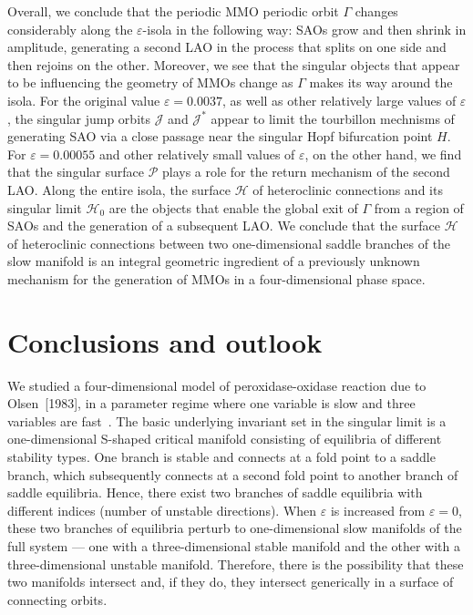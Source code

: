 \documentclass{ws-ijbc}
\begin{document}
Overall, we conclude that the periodic MMO periodic orbit $\Gamma$ changes considerably along the $\varepsilon$-isola in the following way: SAOs grow and then shrink in amplitude, generating a second LAO in the process that splits on one side and then rejoins on the other.  Moreover, we see that the singular objects that appear to be influencing the geometry of MMOs change as $\Gamma$ makes its way around the isola.  For the original value $\varepsilon=0.0037$, as well as other relatively large values of $\varepsilon$, the singular jump orbits $\mathscr{J}$ and $\mathscr{J}^*$ appear to limit the tourbillon mechnisms of generating SAO via a close passage near the singular Hopf bifurcation point $H$. For $\varepsilon=0.00055$ and other relatively small values of $\varepsilon$, on the other hand, we find that the singular surface $\mathscr{P}$ plays a role for the return mechanism of the second LAO. Along the entire isola, the surface $\mathscr{H}$ of heteroclinic connections and its singular limit $\mathscr{H}_0$ are the objects that enable the global exit of $\Gamma$ from a region of SAOs and the generation of a subsequent LAO. We conclude that the surface $\mathscr{H}$ of heteroclinic connections between two one-dimensional saddle branches of the slow manifold is an integral geometric ingredient of a previously unknown mechanism for the generation of MMOs in a four-dimensional phase space.


\section{Conclusions and outlook}
\label{sec:concl}

We studied a four-dimensional model of peroxidase-oxidase reaction due to Olsen~[1983], in a parameter regime where one variable is slow and three variables are fast~\cite{Rescaling}. The basic underlying invariant set in the singular limit is a one-dimensional S-shaped critical manifold consisting of equilibria of different stability types. One branch is stable and connects at a fold point to a saddle branch, which subsequently connects at a second fold point to another branch of saddle equilibria. Hence, there exist two branches of saddle equilibria with different indices (number of unstable directions). When $\varepsilon$ is increased from $\varepsilon = 0$, these two branches of equilibria perturb to one-dimensional slow manifolds of the full system --- one with a three-dimensional stable manifold and the other with a three-dimensional unstable manifold. Therefore, there is the possibility that these two manifolds intersect and, if they do, they intersect generically in a surface of connecting orbits.
\end{document}
